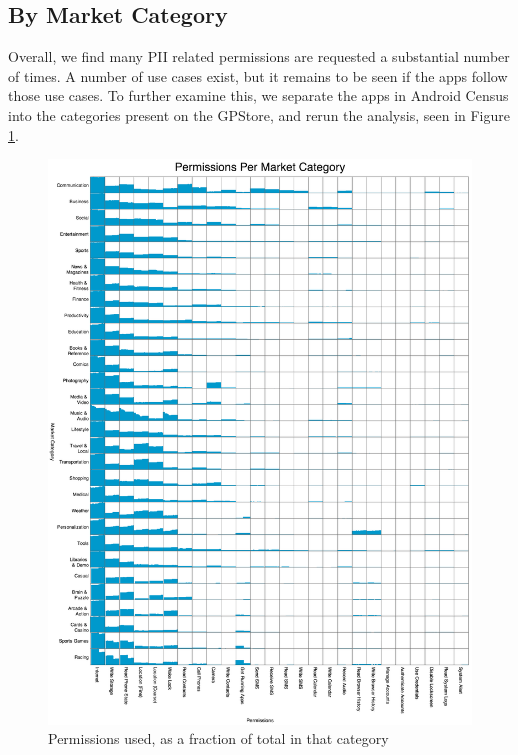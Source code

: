 \subsection{By Market Category}
\label{sec:marketcategory}
Overall, we find many PII related permissions are requested a substantial number of times. A number of use cases exist, but it remains to be seen if the apps follow those use cases. To further examine this, we separate the apps in Android Census into the categories present on the GPStore, and rerun the analysis, seen in Figure \ref{fig:permissionspercategory}.

\begin{figure}[h]
\begin{center}
\includegraphics[width=1.0\columnwidth]{figs/PermissionsforMarketCategory}
\caption{Permissions used, as a fraction of total in that category}
\label{fig:permissionspercategory}
\end{center}
\end{figure}

